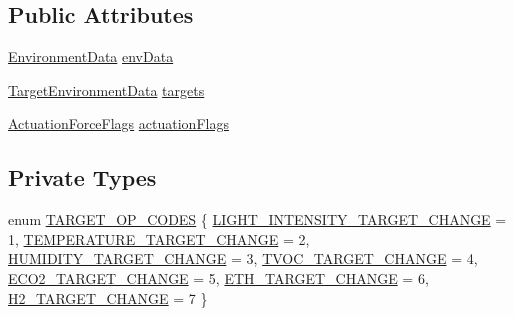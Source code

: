 \subsection*{Public Attributes}
\begin{DoxyCompactItemize}
\item 
\hyperlink{structEnvironmentData}{Environment\+Data} \hyperlink{classController_ac99088334f56588243867ca1c18f9633}{env\+Data}
\item 
\hyperlink{structTargetEnvironmentData}{Target\+Environment\+Data} \hyperlink{classController_a8f2fb8295fd3da6ebc8bdb0f25036322}{targets}
\item 
\hyperlink{structActuationForceFlags}{Actuation\+Force\+Flags} \hyperlink{classController_adb38d16eaea1f98887b3c1fc75ab5bd3}{actuation\+Flags}
\end{DoxyCompactItemize}
\subsection*{Private Types}
\begin{DoxyCompactItemize}
\item 
enum \hyperlink{classController_ae0cc6feb81bc46e0859390fd1551ff43}{T\+A\+R\+G\+E\+T\+\_\+\+O\+P\+\_\+\+C\+O\+D\+ES} \{ \newline
\hyperlink{classController_ae0cc6feb81bc46e0859390fd1551ff43a915722d1485a0a671e6d9740e4f336d7}{L\+I\+G\+H\+T\+\_\+\+I\+N\+T\+E\+N\+S\+I\+T\+Y\+\_\+\+T\+A\+R\+G\+E\+T\+\_\+\+C\+H\+A\+N\+GE} = 1, 
\hyperlink{classController_ae0cc6feb81bc46e0859390fd1551ff43a1c6726567b0f23f4431b2b2693b67ec9}{T\+E\+M\+P\+E\+R\+A\+T\+U\+R\+E\+\_\+\+T\+A\+R\+G\+E\+T\+\_\+\+C\+H\+A\+N\+GE} = 2, 
\hyperlink{classController_ae0cc6feb81bc46e0859390fd1551ff43a9380620e3b95492374b3ac3a3e3bd5e7}{H\+U\+M\+I\+D\+I\+T\+Y\+\_\+\+T\+A\+R\+G\+E\+T\+\_\+\+C\+H\+A\+N\+GE} = 3, 
\hyperlink{classController_ae0cc6feb81bc46e0859390fd1551ff43ab7367a898dd3e0befa174fa4e42f1eeb}{T\+V\+O\+C\+\_\+\+T\+A\+R\+G\+E\+T\+\_\+\+C\+H\+A\+N\+GE} = 4, 
\newline
\hyperlink{classController_ae0cc6feb81bc46e0859390fd1551ff43af162eb21304384728b51aad12ef581c3}{E\+C\+O2\+\_\+\+T\+A\+R\+G\+E\+T\+\_\+\+C\+H\+A\+N\+GE} = 5, 
\hyperlink{classController_ae0cc6feb81bc46e0859390fd1551ff43a93b6d3178783a23734c076d193fcb1fb}{E\+T\+H\+\_\+\+T\+A\+R\+G\+E\+T\+\_\+\+C\+H\+A\+N\+GE} = 6, 
\hyperlink{classController_ae0cc6feb81bc46e0859390fd1551ff43a19170325b57f14dd6d349184ed1379e2}{H2\+\_\+\+T\+A\+R\+G\+E\+T\+\_\+\+C\+H\+A\+N\+GE} = 7
 \}
\end{DoxyCompactItemize}
